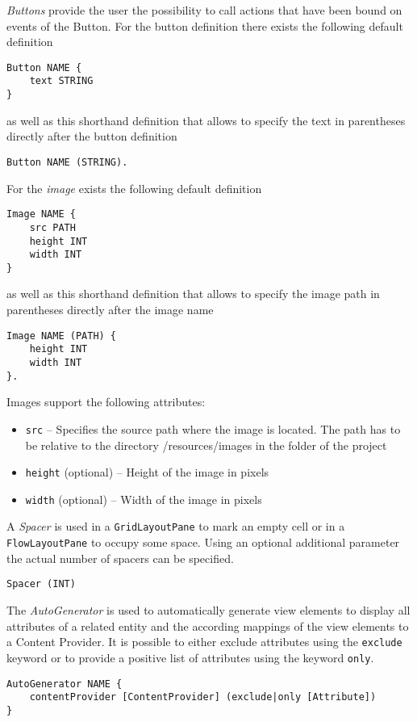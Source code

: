 \textit{Buttons} provide the user the possibility to call actions that have been bound on events of the Button. For the button definition there exists the following default definition
\begin{lstlisting}
Button NAME {
	text STRING
}
\end{lstlisting}
as well as this shorthand definition that allows to specify the text in parentheses directly after the button definition
\begin{lstlisting}
Button NAME (STRING).
\end{lstlisting}


For the \textit{image} exists the following default definition
\begin{lstlisting}
Image NAME {
	src PATH
	height INT
	width INT
}
\end{lstlisting}
as well as this shorthand definition that allows to specify the image path in parentheses directly after the image name
\begin{lstlisting}
Image NAME (PATH) {
	height INT
	width INT
}.
\end{lstlisting}
Images support the following attributes:
\begin{itemize}
\item \lstinline!src! -- Specifies the source path where the image is located. The path has to be relative to the directory /resources/images in the folder of the \MD project
\item \lstinline!height! (optional) -- Height of the image in pixels
\item \lstinline!width! (optional) -- Width of the image in pixels
\end{itemize}

A \textit{Spacer} is used in a \lstinline!GridLayoutPane! to mark an empty cell or in a \lstinline!FlowLayoutPane! to occupy some space. Using an optional additional parameter the actual number of spacers can be specified.
\begin{lstlisting}
Spacer (INT)
\end{lstlisting}

The \textit{AutoGenerator} is used to automatically generate view elements to display all attributes of a related entity and the according mappings of the view elements to a Content Provider. It is possible to either exclude attributes using the \lstinline!exclude! keyword or to provide a positive list of attributes using the keyword \lstinline!only!.
\begin{lstlisting}
AutoGenerator NAME {
	contentProvider [ContentProvider] (exclude|only [Attribute])
}
\end{lstlisting}

